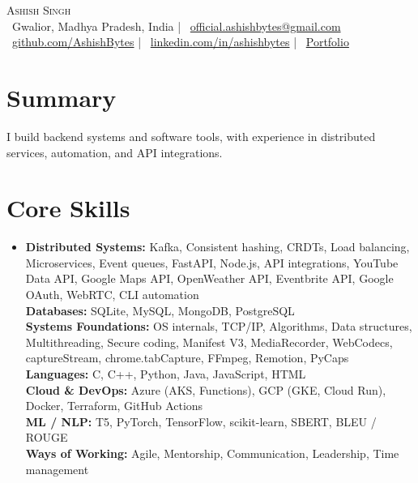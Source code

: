 \documentclass[letterpaper,11pt]{article}
\newcommand{\resumeSubHeadingListStart}{\begin{itemize}[leftmargin=0.15in,label={}]
\setlength\itemsep{0pt}}
\newcommand{\resumeSubHeadingListEnd}{\end{itemize}}
\begin{document}
\begin{center}
  {\Huge\scshape Ashish Singh}\\
  \small
  \ Gwalior, Madhya Pradesh, India \;|\;
  \ \href{mailto:official.ashishbytes@gmail.com}{official.ashishbytes@gmail.com} \\
  \ \href{https://github.com/AshishBytes}{github.com/AshishBytes} \;|\;
  \ \href{https://linkedin.com/in/ashishbytes}{linkedin.com/in/ashishbytes} \;|\;
  \ \href{https://ashishbytes.vercel.app}{Portfolio}
\end{center}

\section{Summary}
\small
I build backend systems and software tools, with experience in distributed services, automation, and API integrations.

\section{Core Skills}
\resumeSubHeadingListStart
  \item\small{
    \textbf{Distributed Systems:} Kafka, Consistent hashing, CRDTs, Load balancing, Microservices, Event queues, FastAPI, Node.js, API integrations, YouTube Data API, Google Maps API, OpenWeather API, Eventbrite API, Google OAuth, WebRTC, CLI automation\\
    \textbf{Databases:} SQLite, MySQL, MongoDB, PostgreSQL\\
    \textbf{Systems Foundations:} OS internals, TCP/IP, Algorithms, Data structures, Multithreading, Secure coding, Manifest V3, MediaRecorder, WebCodecs, captureStream, chrome.tabCapture, FFmpeg, Remotion, PyCaps\\
    \textbf{Languages:} C, C++, Python, Java, JavaScript, HTML\\
    \textbf{Cloud \& DevOps:} Azure (AKS, Functions), GCP (GKE, Cloud Run), Docker, Terraform, GitHub Actions\\
    \textbf{ML / NLP:} T5, PyTorch, TensorFlow, scikit-learn, SBERT, BLEU / ROUGE\\
    \textbf{Ways of Working:} Agile, Mentorship, Communication, Leadership, Time management
  }
\resumeSubHeadingListEnd

\end{document}
